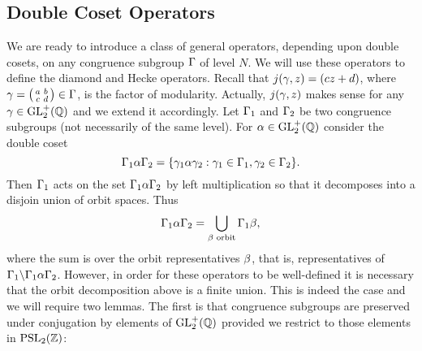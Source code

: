     \subsection*{Double Coset Operators}
      We are ready to introduce a class of general operators, depending upon double cosets, on any congruence subgroup $\Gamma$ of level $N$. We will use these operators to define the diamond and Hecke operators. Recall that $j(\gamma,z) = (cz+d)$, where $\gamma = \begin{psmallmatrix} a & b \\ c & d \end{psmallmatrix} \in \Gamma$, is the factor of modularity. Actually, $j(\gamma,z)$ makes sense for any $\gamma \in \mathrm{GL}_{2}^{+}(\mathbb{Q})$ and we extend it accordingly. Let $\Gamma_{1}$ and $\Gamma_{2}$ be two congruence subgroups (not necessarily of the same level). For $\alpha \in \mathrm{GL}_{2}^{+}(\mathbb{Q})$ consider the double coset
      \[
        \Gamma_{1}\alpha\Gamma_{2} = \{\gamma_{1}\alpha\gamma_{2}:\gamma_{1} \in \Gamma_{1}, \gamma_{2} \in \Gamma_{2}\}.
      \]
      Then $\Gamma_{1}$ acts on the set $\Gamma_{1}\alpha\Gamma_{2}$ by left multiplication so that it decomposes into a disjoin union of orbit spaces. Thus
      \[
        \Gamma_{1}\alpha\Gamma_{2} = \bigcup_{\beta \text{ orbit}}\Gamma_{1}\beta,
      \]
      where the sum is over the orbit representatives $\beta$, that is, representatives of $\Gamma_{1}\backslash\Gamma_{1}\alpha\Gamma_{2}$. However, in order for these operators to be well-defined it is necessary that the orbit decomposition above is a finite union. This is indeed the case and we will require two lemmas. The first is that congruence subgroups are preserved under conjugation by elements of $\mathrm{GL}_{2}^{+}(\mathbb{Q})$ provided we restrict to those elements in $\mathrm{PSL}_{2}(\mathbb{Z})$:

